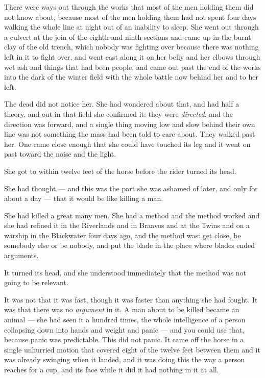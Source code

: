 There were ways out through the works that most of the men holding them did not know about, because most of the men holding them had not spent four days walking the whole line at night out of an inability to sleep. She went out through a culvert at the join of the eighth and ninth sections and came up in the burnt clay of the old trench, which nobody was fighting over because there was nothing left in it to fight over, and went east along it on her belly and her elbows through wet ash and things that had been people, and came out past the end of the works into the dark of the winter field with the whole battle now behind her and to her left.

The dead did not notice her. She had wondered about that, and had half a theory, and out in that field she confirmed it: they were \textit{directed}, and the direction was forward, and a single thing moving low and slow behind their own line was not something the mass had been told to care about. They walked past her. One came close enough that she could have touched its leg and it went on past toward the noise and the light.

She got to within twelve feet of the horse before the rider turned its head.

\sceneBreak

She had thought — and this was the part she was ashamed of later, and only for about a day — that it would be like killing a man.

She had killed a great many men. She had a method and the method worked and she had refined it in the Riverlands and in Braavos and at the Twins and on a warship in the Blackwater four days ago, and the method was: get close, be somebody else or be nobody, and put the blade in the place where blades ended arguments.

It turned its head, and she understood immediately that the method was not going to be relevant.

It was not that it was fast, though it was faster than anything she had fought. It was that there was no \textit{argument} in it. A man about to be killed became an animal — she had seen it a hundred times, the whole intelligence of a person collapsing down into hands and weight and panic — and you could use that, because panic was predictable. This did not panic. It came off the horse in a single unhurried motion that covered eight of the twelve feet between them and it was already swinging when it landed, and it was doing this the way a person reaches for a cup, and its face while it did it had nothing in it at all.

